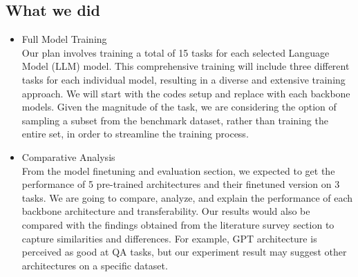 \documentclass{article}
\begin{document}
\subsection{What we did}
\begin{itemize}
    \item Full Model Training \\
Our plan involves training a total of 15 tasks for each selected Language Model (LLM) model. This comprehensive training will include three different tasks for each individual model, resulting in a diverse and extensive training approach. We will start with the codes setup and replace with each backbone models. Given the magnitude of the task, we are considering the option of sampling a subset from the benchmark dataset, rather than training the entire set, in order to streamline the training process.
    \item Comparative Analysis \\
    From the model finetuning and evaluation section, we expected to get the performance of 5 pre-trained architectures and their finetuned version on 3 tasks. We are going to compare, analyze, and explain the performance of each backbone architecture and transferability. Our results would also be compared with the findings obtained from the literature survey section to capture similarities and differences. For example, GPT architecture is perceived as good at QA tasks, but our experiment result may suggest other architectures on a specific dataset.
\end{itemize}
\end{document}
